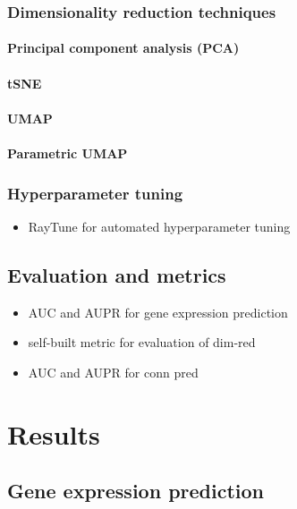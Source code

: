 \documentclass[]{article}
\renewcommand{\cite}{\citep}
\begin{document}
\subsubsection{Dimensionality reduction techniques}
\paragraph{Principal component analysis (PCA)}
\label{sec:pca}

\paragraph{tSNE}
\label{sec:tsne}

\paragraph{UMAP}
\label{sec:umap}

\paragraph{Parametric UMAP}
\label{sec:paraumap}


\subsubsection{Hyperparameter tuning}
\begin{itemize}
	\item RayTune\cite{liaw2018tune} for automated hyperparameter tuning
\end{itemize}

\subsection{Evaluation and metrics}
\label{sec:evalmetrics}
\begin{itemize}
	\item AUC and AUPR for gene expression prediction
	\item self-built metric for evaluation of dim-red
	\item AUC and AUPR for conn pred
\end{itemize}


\newpage
\section{Results}
\label{sec:results}
\subsection{Gene expression prediction}
\end{document}
